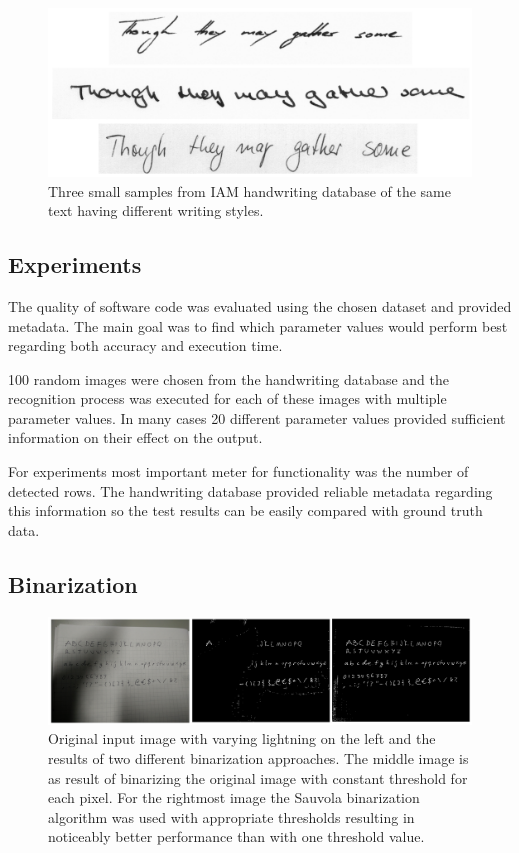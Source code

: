 \documentclass{article}
\begin{document}
    \begin{figure}
      \centering
      \includegraphics[natwidth=1530,natheight=660,scale=0.3]{iamsample.png}
      \caption{Three small samples from IAM handwriting database of the same text having different writing styles. \label{fig:iamsample} }
    \end{figure}

  \subsection{Experiments}
    The quality of software code was evaluated using the chosen dataset and provided metadata. The main goal was to find which parameter values would perform best regarding both accuracy and execution time.

    100 random images were chosen from the handwriting database and the recognition process was executed for each of these images with multiple parameter values. In many cases 20 different parameter values provided sufficient information on their effect on the output.

    For experiments most important meter for functionality was the number of detected rows. The handwriting database provided reliable metadata regarding this information so the test results can be easily compared with ground truth data.

  \subsection{Binarization}
    \begin{figure}
      \centering
      \includegraphics[natwidth=2140,natheight=546,scale=0.24]{binarization.png}
      \caption{Original input image with varying lightning on the left and the results of two different binarization approaches. The middle image is as result of binarizing the original image with constant threshold for each pixel. For the rightmost image the Sauvola binarization algorithm was used with appropriate thresholds resulting in noticeably better performance than with one threshold value. \label{fig:binarization} }
    \end{figure}
\end{document}
